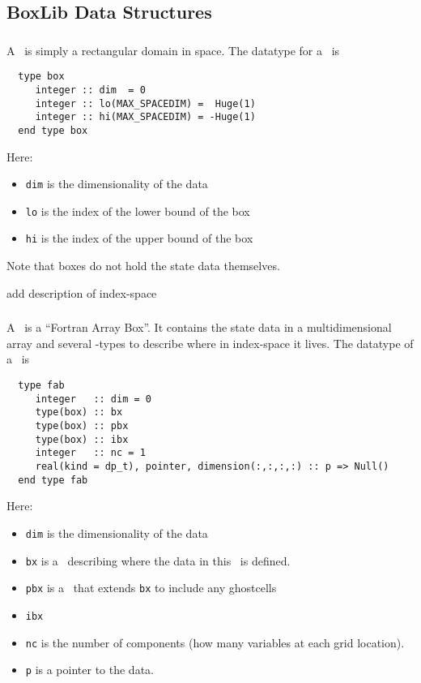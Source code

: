 \subsection{BoxLib Data Structures}

\subsubsection{\boxtype}

A \boxtype\ is simply a rectangular domain in space.  The datatype for
a \boxtype\ is
\begin{verbatim}
  type box
     integer :: dim  = 0
     integer :: lo(MAX_SPACEDIM) =  Huge(1)
     integer :: hi(MAX_SPACEDIM) = -Huge(1)
  end type box
\end{verbatim}

\noindent Here:
\begin{itemize}
\item {\tt dim} is the dimensionality of the data
\item {\tt lo} is the index of the lower bound of the box
\item {\tt hi} is the index of the upper bound of the box
\end{itemize}

Note that boxes do not hold the state data themselves.

add description of index-space

\subsubsection{\fab}

A \fab\ is a ``Fortran Array Box''.  It contains the state data in a
multidimensional array and several \boxtype-types to describe where in
index-space it lives.  The datatype of a \fab\ is
\begin{verbatim}
  type fab
     integer   :: dim = 0
     type(box) :: bx
     type(box) :: pbx
     type(box) :: ibx
     integer   :: nc = 1
     real(kind = dp_t), pointer, dimension(:,:,:,:) :: p => Null()
  end type fab
\end{verbatim}
 
\noindent Here:
\begin{itemize}
\item {\tt dim} is the dimensionality of the data
\item {\tt bx} is a \boxtype\ describing where the data in this
  \fab\ is defined.
\item {\tt pbx} is a \boxtype\ that extends {\tt bx} to include
  any ghostcells
\item {\tt ibx}
\item {\tt nc} is the number of components (how many variables at  
  each grid location).
\item {\tt p} is a pointer to the data.
\end{itemize}

